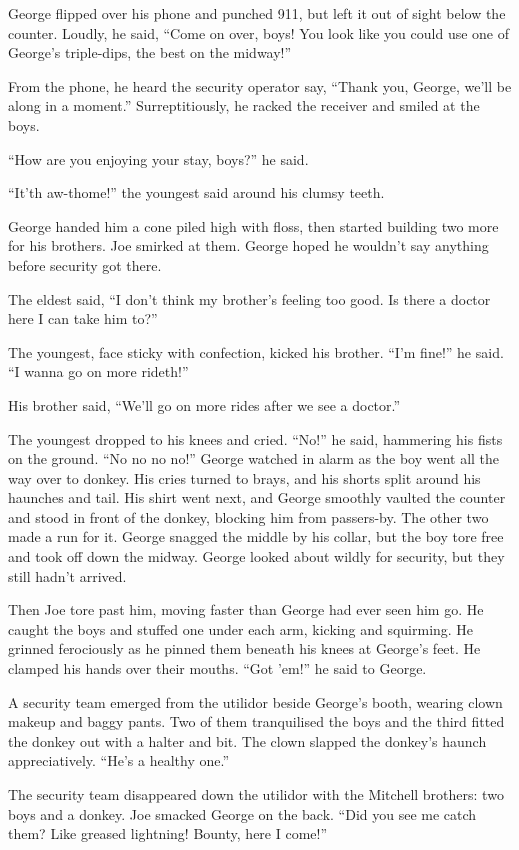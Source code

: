 George flipped over his phone and punched 911, but left it out of
sight below the counter. Loudly, he said,
``Come on over, boys! You look like you could use one of George's triple-dips, 
the best on the midway!''

From the phone, he heard the security operator say,
``Thank you, George, we'll be along in a moment.'' Surreptitiously,
he racked the receiver and smiled at the boys.

``How are you enjoying your stay, boys?'' he said.

``It'th aw-thome!'' the youngest said around his clumsy teeth.

George handed him a cone piled high with floss, then started
building two more for his brothers. Joe smirked at them. George
hoped he wouldn't say anything before security got there.

The eldest said,
``I don't think my brother's feeling too good. Is there a doctor here I can 
take him to?''

The youngest, face sticky with confection, kicked his brother.
``I'm fine!'' he said. ``I wanna go on more rideth!''

His brother said,
``We'll go on more rides after we see a doctor.''

The youngest dropped to his knees and cried. ``No!'' he said,
hammering his fists on the ground. ``No no no no!'' George watched
in alarm as the boy went all the way over to donkey. His cries
turned to brays, and his shorts split around his haunches and tail.
His shirt went next, and George smoothly vaulted the counter and
stood in front of the donkey, blocking him from passers-by. The
other two made a run for it. George snagged the middle by his
collar, but the boy tore free and took off down the midway. George
looked about wildly for security, but they still hadn't arrived.

Then Joe tore past him, moving faster than George had ever seen him
go. He caught the boys and stuffed one under each arm, kicking and
squirming. He grinned ferociously as he pinned them beneath his
knees at George's feet. He clamped his hands over their mouths.
``Got 'em!'' he said to George.

A security team emerged from the utilidor beside George's booth,
wearing clown makeup and baggy pants. Two of them tranquilised the
boys and the third fitted the donkey out with a halter and bit. The
clown slapped the donkey's haunch appreciatively.
``He's a healthy one.''

The security team disappeared down the utilidor with the Mitchell
brothers: two boys and a donkey. Joe smacked George on the back.
``Did you see me catch them? Like greased lightning! Bounty, here I come!''

